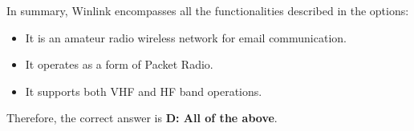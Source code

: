 In summary, Winlink encompasses all the functionalities described in the options:
\begin{itemize}
    \item It is an amateur radio wireless network for email communication.
    \item It operates as a form of Packet Radio.
    \item It supports both VHF and HF band operations.
\end{itemize}

Therefore, the correct answer is \textbf{D: All of the above}.

